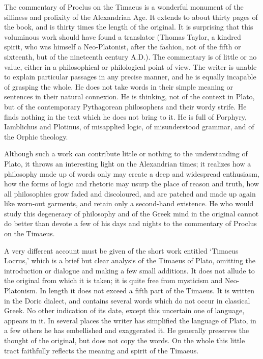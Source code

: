 The commentary of Proclus on the Timaeus is a wonderful monument of the
silliness and prolixity of the Alexandrian Age. It extends to about thirty
pages of the book, and is thirty times the length of the original. It is
surprising that this voluminous work should have found a translator
(Thomas Taylor, a kindred spirit, who was himself a Neo-Platonist, after
the fashion, not of the fifth or sixteenth, but of the nineteenth century
A.D.). The commentary is of little or no value, either in a philosophical
or philological point of view. The writer is unable to explain particular
passages in any precise manner, and he is equally incapable of grasping
the whole. He does not take words in their simple meaning or sentences in
their natural connexion. He is thinking, not of the context in Plato, but
of the contemporary Pythagorean philosophers and their wordy strife. He
finds nothing in the text which he does not bring to it. He is full of
Porphyry, Iamblichus and Plotinus, of misapplied logic, of misunderstood
grammar, and of the Orphic theology.

Although such a work can contribute little or nothing to the understanding
of Plato, it throws an interesting light on the Alexandrian times; it
realizes how a philosophy made up of words only may create a deep and
widespread enthusiasm, how the forms of logic and rhetoric may usurp the
place of reason and truth, how all philosophies grow faded and
discoloured, and are patched and made up again like worn-out garments, and
retain only a second-hand existence. He who would study this degeneracy of
philosophy and of the Greek mind in the original cannot do better than
devote a few of his days and nights to the commentary of Proclus on the
Timaeus.

A very different account must be given of the short work entitled ‘Timaeus
Locrus,’ which is a brief but clear analysis of the Timaeus of Plato,
omitting the introduction or dialogue and making a few small additions. It
does not allude to the original from which it is taken; it is quite free
from mysticism and Neo-Platonism. In length it does not exceed a fifth
part of the Timaeus. It is written in the Doric dialect, and contains
several words which do not occur in classical Greek. No other indication
of its date, except this uncertain one of language, appears in it. In
several places the writer has simplified the language of Plato, in a few
others he has embellished and exaggerated it. He generally preserves the
thought of the original, but does not copy the words. On the whole this
little tract faithfully reflects the meaning and spirit of the Timaeus.

